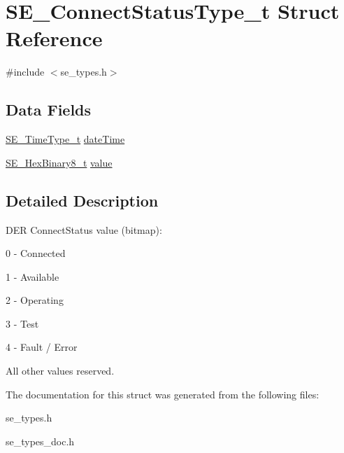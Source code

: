 \hypertarget{structSE__ConnectStatusType__t}{}\section{S\+E\+\_\+\+Connect\+Status\+Type\+\_\+t Struct Reference}
\label{structSE__ConnectStatusType__t}


{\ttfamily \#include $<$se\+\_\+types.\+h$>$}

\subsection*{Data Fields}
\begin{DoxyCompactItemize}
\item 
\hyperlink{group__TimeType_ga6fba87a5b57829b4ff3f0e7638156682}{S\+E\+\_\+\+Time\+Type\+\_\+t} \hyperlink{group__ConnectStatusType_ga5372706a2bc34efc05ea352a246caf99}{date\+Time}
\item 
\hyperlink{group__HexBinary8_gaecf2dab3615fb954a693c017a61f77d6}{S\+E\+\_\+\+Hex\+Binary8\+\_\+t} \hyperlink{group__ConnectStatusType_ga6515f58537159856cbfd403b4bb2919e}{value}
\end{DoxyCompactItemize}


\subsection{Detailed Description}
D\+ER Connect\+Status value (bitmap)\+:

0 -\/ Connected

1 -\/ Available

2 -\/ Operating

3 -\/ Test

4 -\/ Fault / Error

All other values reserved. 

The documentation for this struct was generated from the following files\+:\begin{DoxyCompactItemize}
\item 
se\+\_\+types.\+h\item 
se\+\_\+types\+\_\+doc.\+h\end{DoxyCompactItemize}
